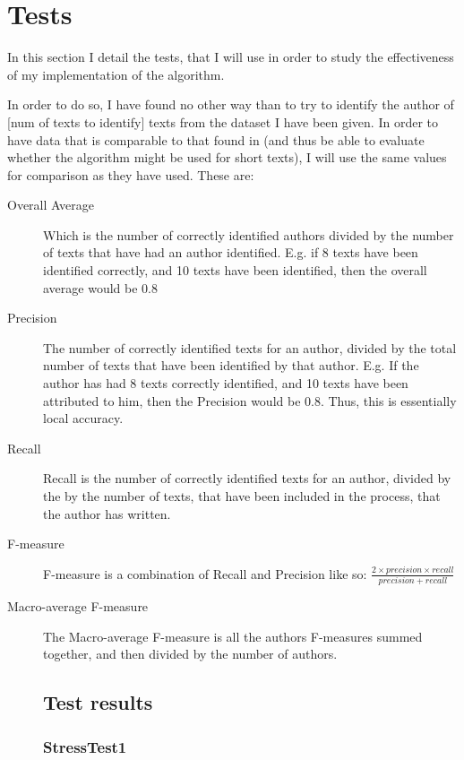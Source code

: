 \section{Tests}
\label{tests}

In this section I detail the tests, that I will use in order to study the effectiveness of my implementation of the algorithm.

In order to do so, I have found no other way than to try to identify the author of [num of texts to identify] texts from the dataset I have been given. In order to have data that is comparable to that found in \cite{nr4} (and thus be able to evaluate whether the algorithm might be used for short texts), I will use the same values for comparison as they have used. These are: 


\begin{description}
\item[Overall Average] Which is the number of correctly identified authors divided by the number of texts that have had an author identified. E.g. if 8 texts have been identified correctly, and 10 texts have been identified, then the overall average would be 0.8 

\item[Precision] The number of correctly identified texts for an author, divided by the total number of texts that have been identified by that author. E.g. If the author has had 8 texts correctly identified, and 10 texts have been attributed to him, then the Precision would be 0.8. Thus, this is essentially local accuracy.

\item[Recall] Recall is the number of correctly identified texts for an author, divided by the by the number of texts, that have been included in the process, that the author has written.

\item[F-measure] F-measure is a combination of Recall and Precision like so: $\frac{2 \times precision \times recall}{precision+recall}$ 

\item[Macro-average F-measure] The Macro-average F-measure is all the authors F-measures summed together, and then divided by the number of authors. 

\subsection{Test results}

\subsubsection{StressTest1}



\end{description}
